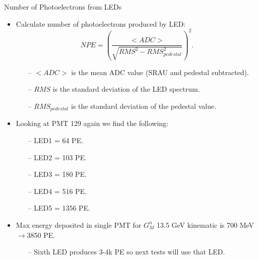 \documentclass[10pt]{beamer}
\begin{document}
\begin{frame}{Number of Photoelectrons from LEDs}

\begin{itemize}
	\item Calculate number of photoelectrons produced by LED:
			\begin{equation}
				NPE = \left( \frac{<ADC>}{\sqrt{RMS^2-RMS_{pedestal}^2}} \right)^2.
			\end{equation}
	\begin{itemize}
		\item[--] $<ADC>$ is the mean ADC value (SRAU and pedestal subtracted).
		\item[--] $RMS$ is the standard deviation of the LED spectrum.
		\item[--] $RMS_{pedestal}$ is the standard deviation of the pedestal value.
	\end{itemize}
	\item Looking at PMT 129 again we find the following:
		\begin{itemize}
			\item[--] LED1 = 64 PE.
			\item[--] LED2 = 103 PE.
			\item[--] LED3 = 180 PE.
			\item[--] LED4 = 516 PE.
			\item[--] LED5 = 1356 PE.
		\end{itemize}
	\item Max energy deposited in single PMT for $G_M^n$ 13.5 GeV kinematic is 700 MeV$\rightarrow$3850 PE.
	\begin{itemize}
		\item[--] Sixth LED produces 3-4k PE so next tests will use that LED.
	\end{itemize}
\end{itemize}	

\end{frame}
\end{document}
